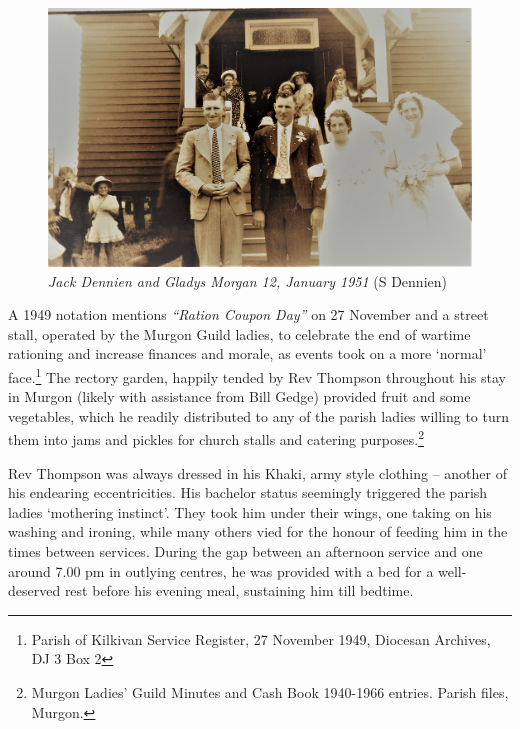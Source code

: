 \begin{figure}[!htb]
\begin{center}
\includegraphics[width=1.\textwidth,center]{../images/JackDennienGladysMorgan12Jan1951.jpg}
\caption{{\itshape Jack Dennien and Gladys Morgan 12, January 1951} {\scriptsize(S Dennien)}}
\end{center}
\end{figure}




A 1949 notation mentions \emph{``Ration Coupon Day''} on 27 November and a street stall, operated by the Murgon Guild ladies, to celebrate the end of wartime rationing and increase finances and morale, as events took on a more `normal' face.\footnote{Parish of Kilkivan Service Register, 27 November 1949, Diocesan Archives, DJ 3 Box 2} The rectory garden, happily tended by Rev Thompson throughout his stay in Murgon (likely with assistance from Bill Gedge) provided fruit and some vegetables, which he readily distributed to any of the parish ladies willing to turn them into jams and pickles for church stalls and catering purposes.\footnote{Murgon Ladies' Guild Minutes and Cash Book 1940-1966 entries. Parish files, Murgon.}


Rev Thompson was always dressed in his Khaki, army style clothing -- another of his endearing eccentricities. His bachelor status seemingly triggered the parish ladies `mothering instinct'. They took him under their wings, one taking on his washing and ironing, while many others vied for the honour of feeding him in the times between services. During the gap between an afternoon service and one around 7.00 pm in outlying centres, he was provided with a bed for a well-deserved rest before his evening meal, sustaining him till bedtime.



